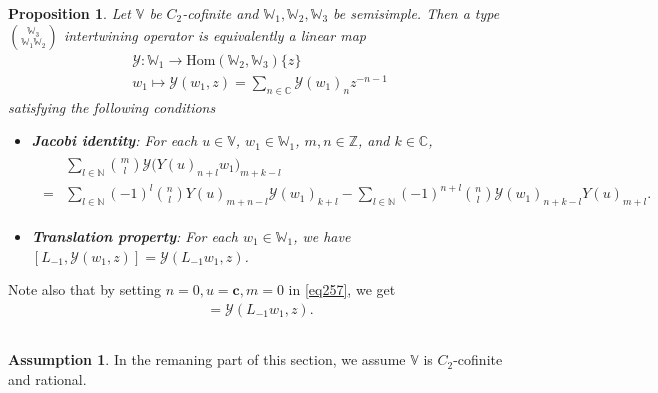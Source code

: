 \documentclass[11pt,b5paper,notitlepage]{article}
\theoremstyle{definition}
\newtheorem{ass}[df]{Assumption}
\theoremstyle{plain}
\newtheorem{pp}[df]{Proposition}
\newcommand{\mc}{\mathcal}
\newcommand{\wtd}{\widetilde}
\newcommand{\Hom}{\mathrm{Hom}}
\newcommand{\Vbb}{\mathbb V}
\newcommand{\Wbb}{\mathbb W}
\newcommand{\Cbb}{\mathbb C}
\newcommand{\Nbb}{\mathbb N}
\newcommand{\Zbb}{\mathbb Z}
\newcommand{\cbf}{\mathbf c}
\numberwithin{equation}{section}
\begin{document}
\begin{pp}
Let $\Vbb$ be $C_2$-cofinite and $\Wbb_1,\Wbb_2,\Wbb_3$ be semisimple. Then a type $\Wbb_3\choose \Wbb_1\Wbb_2$ intertwining operator is equivalently a linear map
\begin{gather*}
\mc Y:\Wbb_1\rightarrow\Hom(\Wbb_2,\Wbb_3)\{z\}\\
w_1\mapsto \mc Y(w_1,z)=\sum_{n\in\Cbb}\mc Y(w_1)_nz^{-n-1}
\end{gather*}
satisfying the following conditions
\begin{itemize}
\item \textbf{Jacobi identity}: For each $u\in\Vbb$, $w_1\in\Wbb_1$, $m,n\in\Zbb$, and $k\in\Cbb$,
\begin{align}
	\begin{aligned}
&\sum_{l\in\Nbb}{m\choose l}\mc Y\big(Y(u)_{n+l}w_1\big)_{m+k-l}\\
=&\sum_{l\in\Nbb}(-1)^l{n\choose l}Y(u)_{m+n-l}\mc Y(w_1)_{k+l}-\sum_{l\in\Nbb}(-1)^{n+l}{n\choose l}\mc Y(w_1)_{n+k-l} Y(u)_{m+l}	.
	\end{aligned}
\end{align}
\item \textbf{Translation property}: For each $w_1\in\Wbb_1$, we have $[L_{-1},\mc Y(w_1,z)]=\mc Y(L_{-1}w_1,z)$.
\end{itemize}
\end{pp}

Note also that by  setting $n=0,u=\cbf,m=0$ in \eqref{eq257}, we get
\begin{align}
[L_{-1},\mc Y(w_1,z)]=\mc Y(L_{-1}w_1,z).\label{eq262}
\end{align}


\subsection{}

\begin{ass}
In the remaning part of this section, we assume $\Vbb$ is $C_2$-cofinite and rational. 
\end{ass}
\end{document}
